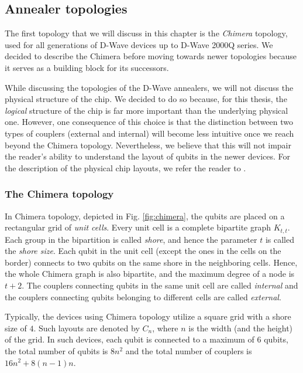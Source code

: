 \subsection{Annealer topologies}

The first topology that we will discuss in this chapter is the \emph{Chimera} topology, used for all
generations of D-Wave devices up to D-Wave 2000Q series. We decided to describe the Chimera before
moving towards newer topologies because it serves as a building block for its successors.

While discussing the topologies of the D-Wave annealers, we will not discuss the physical structure
of the chip. We decided to do so because, for this thesis, the \emph{logical} structure of the chip
is far more important than the underlying physical one. However, one consequence of this
choice is that the distinction between two types of couplers (external and internal) will become
less intuitive once we reach beyond the Chimera topology. Nevertheless, we believe that this will
not impair the reader's ability to understand the layout of qubits in the newer devices. For the
description of the physical chip layouts, we refer the reader to \cite{}.

\subsubsection{The Chimera topology}

In Chimera topology, depicted in Fig. \ref{fig:chimera}, the qubits are placed on a rectangular grid
of \emph{unit cells}. Every unit cell is a complete bipartite graph $K_{t,t}$. Each group in the
bipartition is called \emph{shore}, and hence the parameter $t$ is called the \emph{shore size}.
Each qubit in the unit cell (except the ones in the cells on the border) connects to two qubits on
the same shore in the neighboring cells. Hence, the whole Chimera graph is also bipartite, and
the maximum degree of a node is $t+2$. The couplers connecting qubits in the same unit cell are
called \emph{internal} and the couplers connecting qubits belonging to different cells are called \emph{external}.

Typically, the devices using Chimera topology utilize a square grid with a shore size of $4$. Such
layouts are denoted by $C_n$, where $n$ is the width (and the height) of the grid. In such devices,
each qubit is connected to a maximum of 6 qubits, the total number of qubits is $8n^2$ and the total
number of couplers is $16n^2 + 8(n-1)n$.

